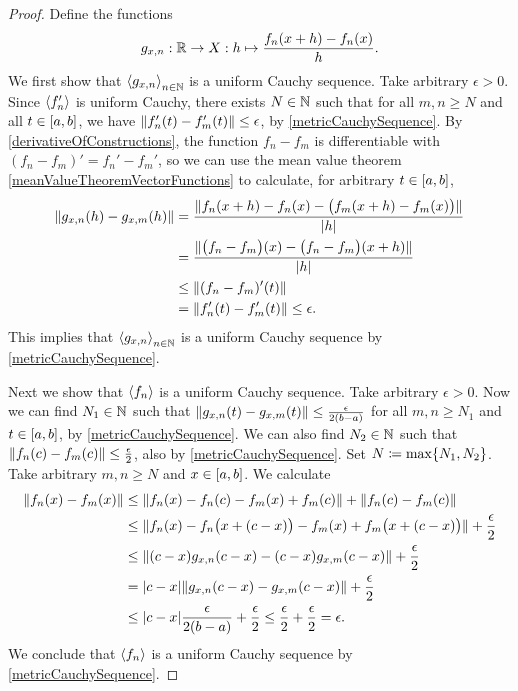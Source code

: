 \begin{proof}
Define the functions
\[ g_{x,n}: \mathbb{R}\to X: h\mapsto \frac{f_n(x+h) - f_n(x)}{h}. \]
We first show that $\left\langle g_{x,n} \right\rangle_{n\in \mathbb{N}}$ is a uniform Cauchy sequence. Take arbitrary $\epsilon > 0$. Since $\left\langle f_n' \right\rangle$ is uniform Cauchy, there exists $N\in \mathbb{N}$ such that for all $m,n\geq N$ and all $t\in \interval{a,b}$, we have $\lVert f_n'(t) - f_m'(t)\rVert \leq \epsilon$, by \ref{metricCauchySequence}. By \ref{derivativeOfConstructions}, the function $f_n - f_m$ is differentiable with $(f_n - f_m)' = f_n' - f_m'$, so we can use the mean value theorem \ref{meanValueTheoremVectorFunctions} to calculate, for arbitrary $t\in \interval{a,b}$,
\begin{align*}
\lVert g_{x,n}(h) - g_{x,m}(h)\rVert &= \frac{\lVert f_n(x+h) - f_n(x) - \big(f_m(x+h) - f_m(x)\big)\rVert}{|h|} \\
&= \frac{\lVert\big(f_n - f_m\big)(x) - \big(f_n - f_m\big)(x+h)\rVert}{|h|} \\
&\leq \lVert(f_n - f_m)'(t)\rVert \\
&= \lVert f_n'(t) - f_m'(t)\rVert \leq \epsilon.
\end{align*}
This implies that $\left\langle g_{x,n} \right\rangle_{n\in \mathbb{N}}$ is a uniform Cauchy sequence by \ref{metricCauchySequence}.

Next we show that $\left\langle f_n \right\rangle$ is a uniform Cauchy sequence. Take arbitrary $\epsilon > 0$. Now we can find $N_1\in \mathbb{N}$ such that $\lVert g_{x,n}(t) - g_{x,m}(t)\rVert \leq \frac{\epsilon}{2(b-a)}$ for all $m,n\geq N_1$ and $t\in \interval{a,b}$, by \ref{metricCauchySequence}. We can also find $N_2 \in \mathbb{N}$ such that $\lVert f_n(c) - f_m(c)\rVert \leq \frac{\epsilon}{2}$, also by \ref{metricCauchySequence}. Set $N\coloneqq \max\{N_1, N_2\}$.
Take arbitrary $m,n\geq N$ and $x\in \interval{a,b}$. We calculate
\begin{align*}
\lVert f_n(x) - f_m(x)\rVert &\leq \lVert f_n(x) - f_n(c) - f_m(x) + f_m(c)\rVert + \lVert f_n(c) - f_m(c)\rVert \\
&\leq \lVert f_n(x) - f_n\big(x + (c-x)\big) - f_m(x) + f_m\big(x + (c-x)\big)\rVert + \frac{\epsilon}{2} \\
&\leq \lVert(c-x)g_{x,n}(c-x) - (c-x)g_{x,m}(c-x)\rVert + \frac{\epsilon}{2} \\
&= |c-x|\lVert g_{x,n}(c-x) - g_{x,m}(c-x)\rVert + \frac{\epsilon}{2} \\
&\leq |c-x|\frac{\epsilon}{2(b-a)} + \frac{\epsilon}{2} \leq \frac{\epsilon}{2}  + \frac{\epsilon}{2}  = \epsilon.
\end{align*}
We conclude that $\left\langle f_n \right\rangle$ is a uniform Cauchy sequence by \ref{metricCauchySequence}.


\end{proof}
